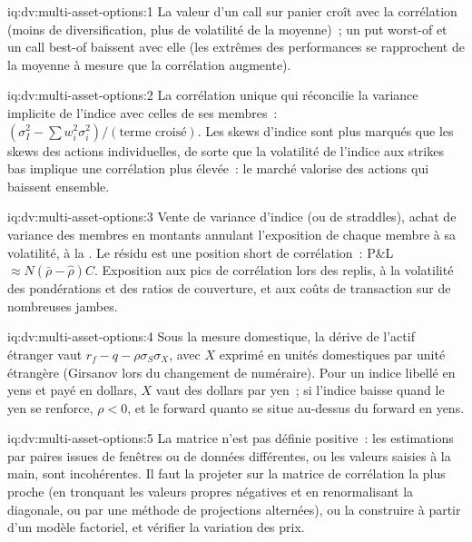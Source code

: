 \begin{solution}{iq:dv:multi-asset-options:1}
La valeur d'un call sur panier croît avec la corrélation (moins de diversification, plus de volatilité de la moyenne)~; un put worst-of et un call best-of
baissent avec elle (les extrêmes des performances se rapprochent de la moyenne à mesure que la corrélation augmente).
\end{solution}

\begin{solution}{iq:dv:multi-asset-options:2}
La corrélation unique qui réconcilie la variance implicite de l'indice avec celles de ses membres~:
$(\sigma_I^2-\sum w_i^2\sigma_i^2)/(\text{terme croisé})$. Les skews d'indice sont plus marqués que les skews des actions individuelles, de sorte que la volatilité de l'indice aux strikes bas implique une corrélation plus élevée~: le
marché valorise des actions qui baissent ensemble.
\end{solution}

\begin{solution}{iq:dv:multi-asset-options:3}
Vente de variance d'indice (ou de straddles), achat de variance des membres en montants annulant l'exposition de chaque membre à sa volatilité, à la
. Le résidu est une position short de corrélation~: P\&L $\approx N(\bar\rho-\hat\rho)C$. Exposition aux pics de corrélation lors des replis,
à la volatilité des pondérations et des ratios de couverture, et aux coûts de transaction sur de nombreuses jambes.
\end{solution}

\begin{solution}{iq:dv:multi-asset-options:4}
Sous la mesure domestique, la dérive de l'actif étranger vaut $r_f-q-\rho\sigma_S\sigma_X$, avec $X$ exprimé en unités domestiques par unité étrangère (Girsanov
lors du changement de numéraire). Pour un indice libellé en yens et payé en dollars, $X$ vaut des dollars par yen~; si l'indice baisse quand le yen se renforce,
$\rho<0$, et le forward quanto se situe au-dessus du forward en yens.
\end{solution}

\begin{solution}{iq:dv:multi-asset-options:5}
La matrice n'est pas définie positive~: les estimations par paires issues de fenêtres ou de données différentes, ou les valeurs saisies à la main, sont incohérentes. Il faut la
projeter sur la matrice de corrélation la plus proche (en tronquant les valeurs propres négatives et en renormalisant la diagonale, ou par une méthode de projections alternées), ou
la construire à partir d'un modèle factoriel, et vérifier la variation des prix.
\end{solution}

